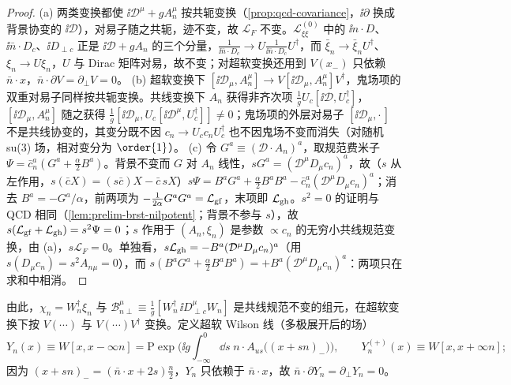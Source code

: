 \begin{proof}
(a) 两类变换都使 $\ii\mathcal D^\mu+gA_n^\mu$ 按共轭变换（\cref{prop:qcd-covariance}，$\ii\partial$ 换成背景协变的 $\ii\mathcal D$），对易子随之共轭，迹不变，故 $\mathcal L_F$ 不变。$\mathcal L^{(0)}_{\xi\xi}$ 中的 $\ii n\cdot D$、$\ii\bar n\cdot D_c$、$\ii D_{\perp c}$ 正是 $\ii\mathcal D+gA_n$ 的三个分量，$\frac1{\ii\bar n\cdot D_c}\to U\frac1{\ii\bar n\cdot D_c}U^\dagger$，而 $\bar\xi_n\to\bar\xi_nU^\dagger$、$\xi_n\to U\xi_n$，$U$ 与 Dirac 矩阵对易，故不变；对超软变换还用到 $V(x_-)$ 只依赖 $\bar n\cdot x$，$\bar n\cdot\partial V=\partial_\perp V=0$。
(b) 超软变换下 $[\ii\mathcal D_\mu,A_n^\mu]\to V[\ii\mathcal D_\mu,A_n^\mu]V^\dagger$，鬼场项的双重对易子同样按共轭变换。共线变换下 $A_n$ 获得非齐次项 $\frac1gU_c[\ii\mathcal D,U_c^\dagger]$，$[\ii\mathcal D_\mu,A_n^\mu]$ 随之获得 $\frac1g[\ii\mathcal D_\mu,U_c[\ii\mathcal D^\mu,U_c^\dagger]]\neq0$；鬼场项的外层对易子 $[\ii\mathcal D_\mu,\cdot\,]$ 不是共线协变的，其变分既不因 $c_n\to U_cc_nU_c^\dagger$ 也不因鬼场不变而消失（对随机 su(3) 场，相对变分为 $\order{1}$）。%
(c) 令 $G^a\equiv(\mathcal D\cdot A_n)^a$，取规范费米子 $\Psi=\bar c_n^a(G^a+\frac\alpha2B^a)$。背景不变而 $G$ 对 $A_n$ 线性，$sG^a=(\mathcal D^\mu D_\mu c_n)^a$，故（$s$ 从左作用，$s(\bar cX)=(s\bar c)X-\bar c\,sX$）$s\Psi=B^aG^a+\frac\alpha2B^aB^a-\bar c_n^a(\mathcal D^\mu D_\mu c_n)^a$；消去 $B^a=-G^a/\alpha$，前两项为 $-\frac1{2\alpha}G^aG^a=\mathcal L_{\rm gf}$，末项即 $\mathcal L_{\rm gh}$。$s^2=0$ 的证明与 QCD 相同（\cref{lem:prelim-brst-nilpotent}；背景不参与 $s$），故 $s(\mathcal L_{\rm gf}+\mathcal L_{\rm gh})=s^2\Psi=0$；$s$ 作用于 $(A_n,\xi_n)$ 是参数 $\propto c_n$ 的无穷小共线规范变换，由 (a)，$s\mathcal L_F=0$。单独看，$s\mathcal L_{\rm gh}=-B^a(\mathcal D^\mu D_\mu c_n)^a$（用 $s(D_\mu c_n)=s^2A_{n\mu}=0$），而 $s(B^aG^a+\frac\alpha2B^aB^a)=+B^a(\mathcal D^\mu D_\mu c_n)^a$：两项只在求和中相消。
\end{proof}

由此，$\chi_n=W_n^\dagger\xi_n$ 与 $\mathcal B^\mu_{n\perp}\equiv\frac1g[W_n^\dagger\,\ii D^\mu_{\perp c}W_n]$ 是共线规范不变的组元，在超软变换下按 $V(\cdots)$ 与 $V(\cdots)V^\dagger$ 变换。定义超软 Wilson 线（多极展开后的场）
\begin{equation}\label{eq:scet-Yn}
Y_n(x)\equiv W[x,x-\infty n]=\mathrm P\exp\Big(\ii g\int_{-\infty}^0\dd s\;n\cdot A_{us}\big((x+sn)_-\big)\Big),\qquad
Y_n^{(+)}(x)\equiv W[x,x+\infty n];
\end{equation}
因为 $(x+sn)_-=(\bar n\cdot x+2s)\frac n2$，$Y_n$ 只依赖于 $\bar n\cdot x$，故 $\bar n\cdot\partial Y_n=\partial_\perp Y_n=0$。

